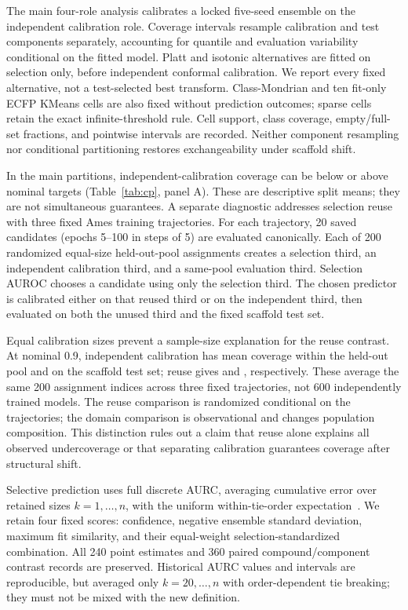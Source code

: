 \documentclass[runningheads,a4paper]{llncs}
\begin{document}
The main four-role analysis calibrates a locked five-seed ensemble on the independent calibration role. Coverage intervals resample calibration and test components separately, accounting for quantile and evaluation variability conditional on the fitted model. Platt and isotonic alternatives are fitted on selection only, before independent conformal calibration. We report every fixed alternative, not a test-selected best transform. Class-Mondrian and ten fit-only ECFP KMeans cells are also fixed without prediction outcomes; sparse cells retain the exact infinite-threshold rule. Cell support, class coverage, empty/full-set fractions, and pointwise intervals are recorded. Neither component resampling nor conditional partitioning restores exchangeability under scaffold shift.



In the main partitions, independent-calibration coverage can be below or above nominal targets (Table~\ref{tab:cp}, panel A). These are descriptive split means; they are not simultaneous guarantees. A separate diagnostic addresses selection reuse with three fixed Ames training trajectories. For each trajectory, 20 saved candidates (epochs 5--100 in steps of 5) are evaluated canonically. Each of 200 randomized equal-size held-out-pool assignments creates a selection third, an independent calibration third, and a same-pool evaluation third. Selection AUROC chooses a candidate using only the selection third. The chosen predictor is calibrated either on that reused third or on the independent third, then evaluated on both the unused third and the fixed scaffold test set.

Equal calibration sizes prevent a sample-size explanation for the reuse contrast. At nominal 0.9, independent calibration has mean coverage \PoolIndependent{} within the held-out pool and \ShiftIndependent{} on the scaffold test set; reuse gives \PoolReused{} and \ShiftReused{}, respectively. These average the same 200 assignment indices across three fixed trajectories, not 600 independently trained models. The reuse comparison is randomized conditional on the trajectories; the domain comparison is observational and changes population composition. This distinction rules out a claim that reuse alone explains all observed undercoverage or that separating calibration guarantees coverage after structural shift.

Selective prediction uses full discrete AURC, averaging cumulative error over retained sizes $k=1,\ldots,n$, with the uniform within-tie-order expectation~\cite{geifman2017selective}. We retain four fixed scores: confidence, negative ensemble standard deviation, maximum fit similarity, and their equal-weight selection-standardized combination. All 240 point estimates and 360 paired compound/component contrast records are preserved. Historical AURC values and intervals are reproducible, but averaged only $k=20,\ldots,n$ with order-dependent tie breaking; they must not be mixed with the new definition.
\end{document}
